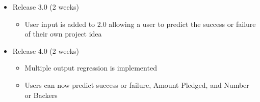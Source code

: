 \documentclass[12pt,final]{article}
\begin{document}
\begin{itemize}
\item Release 3.0 (2 weeks)
\begin{itemize}
\item User input is added to 2.0 allowing a user to predict the success or failure of their own project idea
\end{itemize}
\item Release 4.0 (2 weeks)
\begin{itemize}
\item Multiple output regression is implemented
\item Users can now predict success or failure, Amount Pledged, and Number or Backers
\end{itemize}


\end{itemize}
\end{document}

